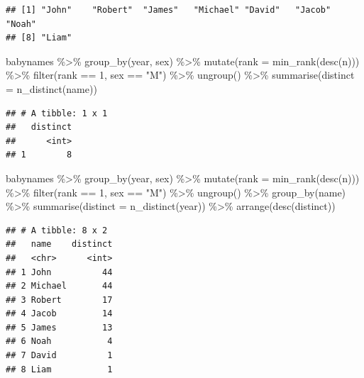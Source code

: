 \documentclass[
]{article}
\newenvironment{Shaded}{\begin{snugshade}}{\end{snugshade}}
\newcommand{\AttributeTok}[1]{\textcolor[rgb]{0.77,0.63,0.00}{#1}}
\newcommand{\DecValTok}[1]{\textcolor[rgb]{0.00,0.00,0.81}{#1}}
\newcommand{\FunctionTok}[1]{\textcolor[rgb]{0.00,0.00,0.00}{#1}}
\newcommand{\NormalTok}[1]{#1}
\newcommand{\SpecialCharTok}[1]{\textcolor[rgb]{0.00,0.00,0.00}{#1}}
\newcommand{\StringTok}[1]{\textcolor[rgb]{0.31,0.60,0.02}{#1}}
\begin{document}
\begin{verbatim}
## [1] "John"    "Robert"  "James"   "Michael" "David"   "Jacob"   "Noah"   
## [8] "Liam"
\end{verbatim}

\begin{Shaded}
\begin{Highlighting}[]
\NormalTok{babynames }\SpecialCharTok{\%\textgreater{}\%} 
  \FunctionTok{group\_by}\NormalTok{(year, sex) }\SpecialCharTok{\%\textgreater{}\%} 
  \FunctionTok{mutate}\NormalTok{(}\AttributeTok{rank =} \FunctionTok{min\_rank}\NormalTok{(}\FunctionTok{desc}\NormalTok{(n))) }\SpecialCharTok{\%\textgreater{}\%} 
  \FunctionTok{filter}\NormalTok{(rank }\SpecialCharTok{==} \DecValTok{1}\NormalTok{, sex }\SpecialCharTok{==} \StringTok{"M"}\NormalTok{) }\SpecialCharTok{\%\textgreater{}\%} 
  \FunctionTok{ungroup}\NormalTok{() }\SpecialCharTok{\%\textgreater{}\%} 
  \FunctionTok{summarise}\NormalTok{(}\AttributeTok{distinct =} \FunctionTok{n\_distinct}\NormalTok{(name))}
\end{Highlighting}
\end{Shaded}

\begin{verbatim}
## # A tibble: 1 x 1
##   distinct
##      <int>
## 1        8
\end{verbatim}

\begin{Shaded}
\begin{Highlighting}[]
\NormalTok{babynames }\SpecialCharTok{\%\textgreater{}\%} 
  \FunctionTok{group\_by}\NormalTok{(year, sex) }\SpecialCharTok{\%\textgreater{}\%} 
  \FunctionTok{mutate}\NormalTok{(}\AttributeTok{rank =} \FunctionTok{min\_rank}\NormalTok{(}\FunctionTok{desc}\NormalTok{(n))) }\SpecialCharTok{\%\textgreater{}\%} 
  \FunctionTok{filter}\NormalTok{(rank }\SpecialCharTok{==} \DecValTok{1}\NormalTok{, sex }\SpecialCharTok{==} \StringTok{"M"}\NormalTok{) }\SpecialCharTok{\%\textgreater{}\%} 
  \FunctionTok{ungroup}\NormalTok{() }\SpecialCharTok{\%\textgreater{}\%} 
  \FunctionTok{group\_by}\NormalTok{(name) }\SpecialCharTok{\%\textgreater{}\%}
  \FunctionTok{summarise}\NormalTok{(}\AttributeTok{distinct =} \FunctionTok{n\_distinct}\NormalTok{(year)) }\SpecialCharTok{\%\textgreater{}\%}
  \FunctionTok{arrange}\NormalTok{(}\FunctionTok{desc}\NormalTok{(distinct))}
\end{Highlighting}
\end{Shaded}

\begin{verbatim}
## # A tibble: 8 x 2
##   name    distinct
##   <chr>      <int>
## 1 John          44
## 2 Michael       44
## 3 Robert        17
## 4 Jacob         14
## 5 James         13
## 6 Noah           4
## 7 David          1
## 8 Liam           1
\end{verbatim}
\end{document}
